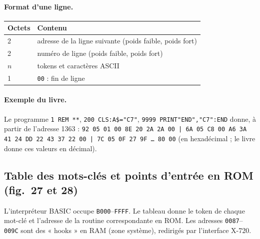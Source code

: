 \documentclass[a4paper,10pt]{article}
\newcommand{\hex}[1]{\texttt{#1}}
\begin{document}
\paragraph{Format d'une ligne.}
\begin{center}\small
\begin{tabular}{@{}ll@{}}
\toprule
Octets & Contenu \\
\midrule
2 & adresse de la ligne suivante (poids faible, poids fort) \\
2 & numéro de ligne (poids faible, poids fort) \\
$n$ & tokens et caractères ASCII \\
1 & \hex{00} : fin de ligne \\
\bottomrule
\end{tabular}
\end{center}

\paragraph{Exemple du livre.} Le programme \texttt{1 REM **}, \texttt{200 CLS:A\$="C7"},
\texttt{9999 PRINT"END","C7":END} donne, à partir de l'adresse 1363 :
\texttt{92 05 01 00 8E 20 2A 2A 00 | 6A 05 C8 00 A6 3A 41 24 DD 22 43 37 22 00 | 7C 05 0F 27 9F \dots{} 80 00}
(en hexadécimal ; le livre donne ces valeurs en décimal).

\subsection{Table des mots-clés et points d'entrée en ROM (fig.~27 et 28)}
L'interpréteur BASIC occupe \hex{B000}--\hex{FFFF}. Le tableau donne le token
de chaque mot-clé et l'adresse de la routine correspondante en ROM.
Les adresses \hex{0087}--\hex{009C} sont des « hooks » en RAM (zone système),
redirigés par l'interface X-720.
\end{document}
